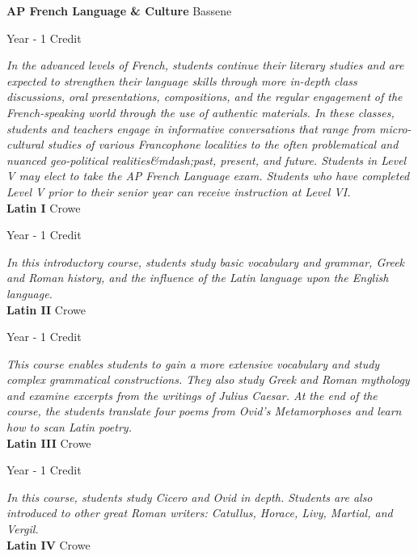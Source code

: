 \noindent\textbf{AP French Language \& Culture} \hfill Bassene

\noindent Year - 1 Credit

\vspace{1mm}\emph{In the advanced levels of French, students continue their literary studies and are expected to strengthen their language skills through more in-depth class discussions, oral presentations, compositions, and the regular engagement of the French-speaking world through the use of authentic materials. In these classes, students and teachers engage in informative conversations that range from micro-cultural studies of various Francophone localities to the often problematical and nuanced geo-political realities\&mdash;past, present, and future. Students in Level V may elect to take the AP French Language exam. Students who have completed Level V prior to their senior year can receive instruction at Level VI.}\\

\noindent\textbf{Latin I} \hfill Crowe

\noindent Year - 1 Credit

\vspace{1mm}\emph{In this introductory course, students study basic vocabulary and grammar, Greek and Roman history, and the influence of the Latin language upon the English language.}\\

\noindent\textbf{Latin II} \hfill Crowe

\noindent Year - 1 Credit

\vspace{1mm}\emph{This course enables students to gain a more extensive vocabulary and study complex grammatical constructions.  They also study Greek and Roman mythology and examine excerpts from the writings of Julius Caesar.  At the end of the course, the students translate four poems from Ovid’s Metamorphoses and learn how to scan Latin poetry.}\\

\noindent\textbf{Latin III} \hfill Crowe

\noindent Year - 1 Credit

\vspace{1mm}\emph{In this course, students study Cicero and Ovid in depth.  Students are also introduced to other great Roman writers: Catullus, Horace, Livy, Martial, and Vergil.}\\

\noindent\textbf{Latin IV} \hfill Crowe

